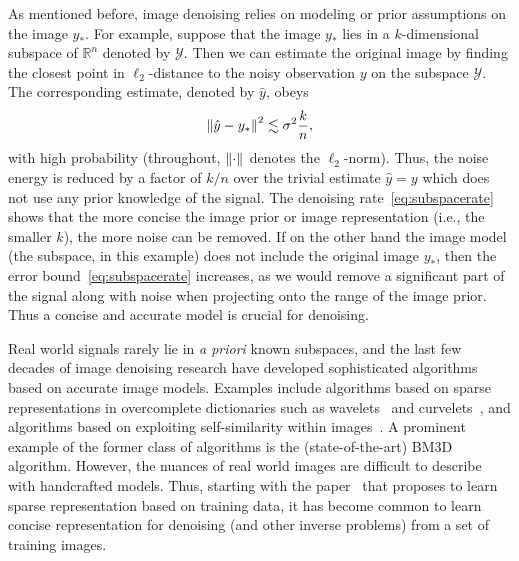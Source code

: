 As mentioned before, image denoising relies on modeling or prior assumptions on the image $y_\ast$. For example, suppose that the image $y_\ast$ lies in a $k$-dimensional subspace of $\mathbb R^n$ denoted by $\mathcal Y$.
Then we can estimate the original image by finding the closest point in $\ell_2$-distance to the noisy observation $y$ on the subspace $\mathcal Y$.
The corresponding estimate, denoted by $\hat y$, obeys
\begin{align}
\label{eq:subspacerate}
{\left\|\hat y - y_\ast\right\|}_{}^2 \lesssim \sigma^2 \frac{k}{n},
\end{align}
with high probability (throughout, ${\left\|\cdot\right\|}_{}$ denotes the $\ell_2$-norm).
Thus, the noise energy is reduced by a factor of $k/n$ over the trivial estimate $\hat y = y$ which does not use any prior knowledge of the signal.
The denoising rate~\eqref{eq:subspacerate} shows that the more concise the image prior or image representation (i.e., the smaller $k$), the more noise can be removed. If on the other hand the image model (the subspace, in this example) does not include the original image $y_\ast$, then the error bound~\eqref{eq:subspacerate} increases, as we would remove a significant part of the signal along with noise when projecting onto the range of the image prior.
Thus a concise and accurate model is crucial for denoising.

Real world signals rarely lie in \emph{a priori} known subspaces, and the last few decades of image denoising research have developed sophisticated algorithms based on accurate image models.
Examples include algorithms based on sparse representations in overcomplete dictionaries such as wavelets~\citep{donoho_de-noising_1995} and curvelets~\citep{starck_curvelet_2002}, and algorithms based on exploiting self-similarity within images~\citep{dabov_image_2007}.
A prominent example of the former class of algorithms is the (state-of-the-art) BM3D~\citep{dabov_image_2007} algorithm. %
However, the nuances of real world images are difficult to describe with handcrafted models. Thus, starting with the paper~\citep{elad_image_2006} that proposes to learn sparse representation based on training data,
it has become common to learn concise representation for denoising (and other inverse problems) from a set of training images.

